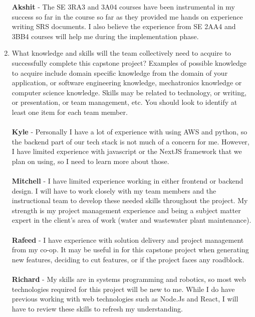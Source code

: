 \documentclass[12pt]{article}
\begin{document}
\begin{enumerate}
    \textbf{Akshit} - The SE 3RA3 and 3A04 courses have been
    instrumental in my success
    so far in the course so far as they provided me hands on
    experience writing SRS
    documents. I also believe the experience from SE 2AA4 and 3BB4
    courses will help me during
    the implementation phase.\\
  \item What knowledge and skills will the team collectively need to
    acquire to successfully complete this capstone project?  Examples
    of possible knowledge to acquire include domain specific
    knowledge from the domain of your application, or software
    engineering knowledge, mechatronics knowledge or computer science
    knowledge.  Skills may be related to technology, or writing, or
    presentation, or team management, etc.  You should look to
    identify at least one item for each team member. \\
    \\
    \textbf{Kyle} - Personally I have a lot of experience with using
    AWS and python, so the backend part of our tech stack is not much
    of a concern for me. However, I have limited experience with
    javascript or the NextJS framework that we plan on using, so I
    need to learn more about those.\\
    \\
    \textbf{Mitchell} - I have limited experience working in either
    frontend or backend design. I will have to work closely with my
    team members and the instructional team to develop these needed
    skills throughout the project. My strength is my project
    management experience and being a subject matter expert in the
    client's area of work (water and wastewater plant maintenance).\\
    \\
    \textbf{Rafeed} - I have experience with solution delivery and
    project management from my co-op. It may be useful in for this
    capstone project when generating new features, deciding to cut
    features, or if the project faces any roadblock. \\
    \\
    \textbf{Richard} - My skills are in systems programming and robotics, so
    most web technologies required for this project will be new to me. While I
    do have previous working with web technologies such as Node.Js and React,
    I will have to review these skills to refresh my understanding.\\
    \\

\end{enumerate}
\end{document}
